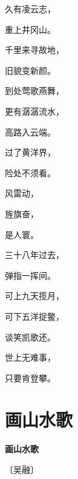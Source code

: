 \documentclass[12pt,UTF-8,openany,fontset=none]{ctexbook}
\begin{document}
\begin{center}
    \begin{Large}

        久有凌云志，

        重上井冈山。

        千里来寻故地，

        旧貌变新颜。

        到处莺歌燕舞，

        更有潺潺流水，

        高路入云端。

        过了黄洋界，

        险处不须看。

        \vspace{18pt}  %

        风雷动，

        旌旗奋，

        是人寰。

        三十八年过去，

        弹指一挥间。

        可上九天揽月，

        可下五洋捉鳖，

        谈笑凯歌还。

        世上无难事，

        只要肯登攀。

    \end{Large}

\end{center}

\vspace{8pt}
\clearpage

\section{画山水歌}


\begin{center}
    {\bfseries 画山水歌}

    \vspace{18pt}

    \begin{large}\xuwen
        〔吴融〕
    \end{large}

\end{center}

    \vspace{18pt}  %
\end{document}
